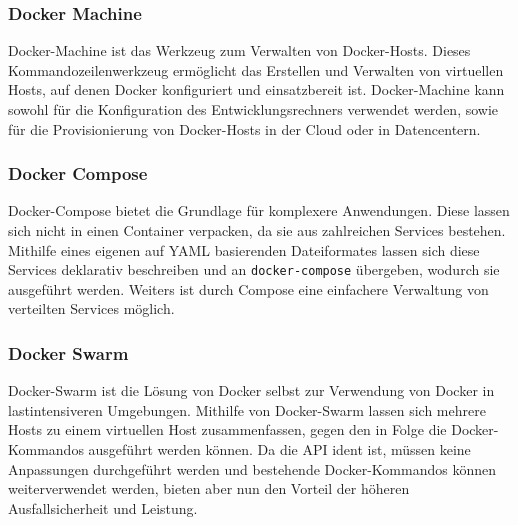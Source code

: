 \subsubsection{Docker Machine}
\label{sec:docker-machine}
Docker-Machine ist das Werkzeug zum Verwalten von Docker-Hosts.
Dieses Kommandozeilenwerkzeug ermöglicht das Erstellen und Verwalten von virtuellen Hosts, auf denen Docker konfiguriert und einsatzbereit ist.
Docker-Machine kann sowohl für die Konfiguration des Entwicklungsrechners verwendet werden, sowie für die Provisionierung von Docker-Hosts in der Cloud oder in Datencentern.
\subsubsection{Docker Compose}
\label{sec:docker-compose}
Docker-Compose bietet die Grundlage für komplexere Anwendungen.
Diese lassen sich nicht in einen Container verpacken, da sie aus zahlreichen Services bestehen.
Mithilfe eines eigenen auf YAML basierenden Dateiformates lassen sich diese Services deklarativ beschreiben und an \texttt{docker-compose} übergeben, wodurch sie ausgeführt werden.
Weiters ist durch Compose eine einfachere Verwaltung von verteilten Services möglich.
\subsubsection{Docker Swarm}
\label{sec:docker-swarm}
Docker-Swarm ist die Lösung von Docker selbst zur Verwendung von Docker in lastintensiveren Umgebungen.
Mithilfe von Docker-Swarm lassen sich mehrere Hosts zu einem virtuellen Host zusammenfassen, gegen den in Folge die Docker-Kommandos ausgeführt werden können.
Da die API ident ist, müssen keine Anpassungen durchgeführt werden und bestehende Docker-Kommandos können weiterverwendet werden, bieten aber nun den Vorteil der höheren Ausfallsicherheit und Leistung.



